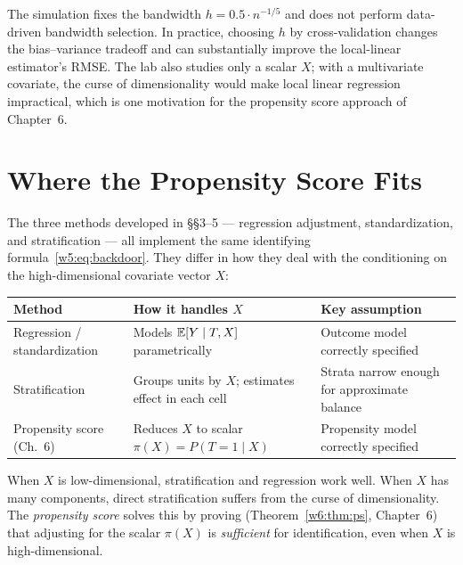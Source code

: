 \documentclass[master.tex]{subfiles}
\begin{document}
\begin{remark}
\label{w5:rem:lab-limits}
The simulation fixes the bandwidth $h = 0.5 \cdot n^{-1/5}$ and does
not perform data-driven bandwidth selection.  In practice, choosing $h$
by cross-validation changes the bias--variance tradeoff and can
substantially improve the local-linear estimator's RMSE.  The lab also
studies only a scalar $X$; with a multivariate covariate, the curse of
dimensionality would make local linear regression impractical, which
is one motivation for the propensity score approach of Chapter~6.
\end{remark}

\section{Where the Propensity Score Fits}

The three methods developed in §§3--5 --- regression adjustment,
standardization, and stratification --- all implement the same
identifying formula~\eqref{w5:eq:backdoor}.  They differ in how they
deal with the conditioning on the high-dimensional covariate vector $X$:

\medskip
\begin{center}
\renewcommand{\arraystretch}{1.4}
\begin{tabular}{p{3.5cm} p{5cm} p{4.5cm}}
\toprule
\textbf{Method} & \textbf{How it handles $X$} & \textbf{Key assumption} \\
\midrule
Regression / standardization
  & Models $\mathbb{E}[Y \mid T,X]$ parametrically
  & Outcome model correctly specified \\[4pt]
Stratification
  & Groups units by $X$; estimates effect in each cell
  & Strata narrow enough for approximate balance \\[4pt]
Propensity score (Ch.~6)
  & Reduces $X$ to scalar $\pi(X) = P(T{=}1 \mid X)$
  & Propensity model correctly specified \\
\bottomrule
\end{tabular}
\end{center}
\renewcommand{\arraystretch}{1}

\medskip
When $X$ is low-dimensional, stratification and regression work well.
When $X$ has many components, direct stratification suffers from the
curse of dimensionality.  The \emph{propensity score} solves this by
proving (Theorem~\ref{w6:thm:ps}, Chapter~6) that adjusting for the
scalar $\pi(X)$ is \emph{sufficient} for identification, even when $X$ is
high-dimensional.
\end{document}
